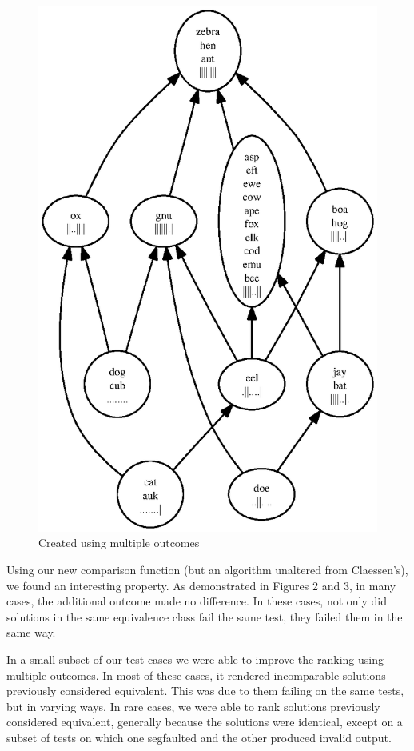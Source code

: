 \documentclass[11pt,twoside]{article}
\theoremstyle{definition}
\begin{document}
\begin{figure}
\includegraphics[scale=0.75]{rank2.ps}
\caption{Created using multiple outcomes}
\end{figure}

Using our new comparison function (but an algorithm unaltered from Claessen's), we found an interesting property. As demonstrated in Figures 2 and 3, in many cases, the additional outcome made no difference. In these cases, not only did solutions in the same equivalence class fail the same test, they failed them in the same way.

In a small subset of our test cases
we were able to improve the ranking using multiple outcomes. In most of these cases, it rendered incomparable solutions previously considered equivalent. This was due to them failing on the same tests, but in varying ways. In rare cases, we were able to rank solutions previously considered equivalent, generally because the solutions were identical, except on a subset of tests on which one segfaulted and the other produced invalid output.
\end{document}
